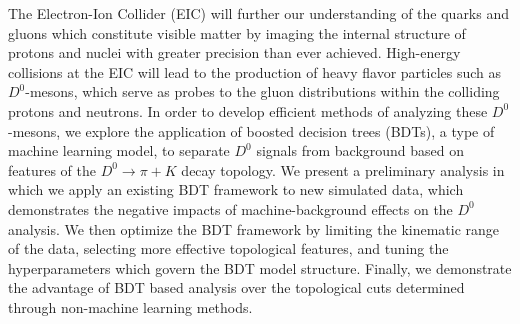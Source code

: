 The Electron-Ion Collider (EIC) will further our understanding of the quarks and gluons which constitute visible matter by imaging the internal structure of protons and nuclei with greater precision than ever achieved. High-energy collisions at the EIC will lead to the production of heavy flavor particles such as $D^0$-mesons, which serve as probes to the gluon distributions within the colliding protons and neutrons. In order to develop efficient methods of analyzing these $D^0$-mesons, we explore the application of boosted decision trees (BDTs), a type of machine learning model, to separate $D^0$ signals from background based on features of the $D^0\rightarrow\pi+K$ decay topology. We present a preliminary analysis in which we apply an existing BDT framework to new simulated data, which demonstrates the negative impacts of machine-background effects on the $D^0$ analysis. We then optimize the BDT framework by limiting the kinematic range of the data, selecting more effective topological features, and tuning the hyperparameters which govern the BDT model structure. Finally, we demonstrate the advantage of BDT based analysis over the topological cuts determined through non-machine learning methods.